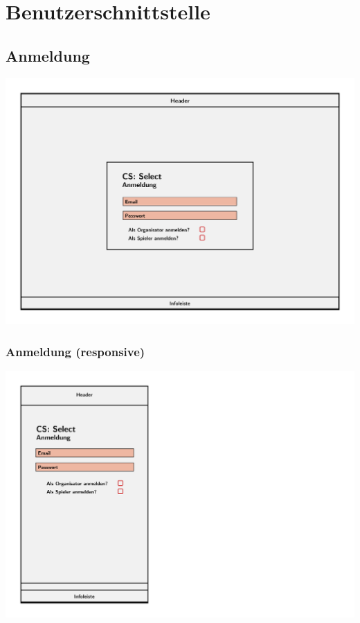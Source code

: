 \documentclass[a4paper]{scrreprt}
\begin{document}
    \chapter{Benutzerschnittstelle}

    \section{Anmeldung}
    \centering
    \includegraphics[width=\textwidth]{../pictures/Anmeldung.jpg}
    \subsection{Anmeldung (responsive)}
    \centering
    \includegraphics[width=\textwidth]{../pictures/Anmeldung_responsive.jpg}
\end{document}
